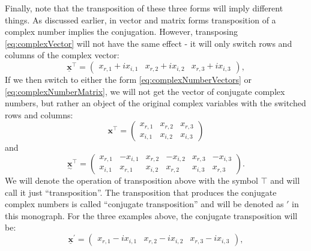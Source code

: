 \documentclass[
]{book}
\begin{document}
Finally, note that the transposition of these three forms will imply different things. As discussed earlier, in vector and matrix forms transposition of a complex number implies the conjugation. However, transposing \eqref{eq:complexVector} will not have the same effect - it will only switch rows and columns of the complex vector:
\begin{equation}
    \underline{\mathbf{x}}^{\top} = \begin{pmatrix} x_{r,1} + i x_{i,1} & x_{r,2} + i x_{i,2} & x_{r,3} + i x_{i,3}
                        \end{pmatrix} ,
    \label{eq:complexVectorTransposed}
\end{equation}
If we then switch to either the form \eqref{eq:complexNumberVectors} or \eqref{eq:complexNumberMatrix}, we will not get the vector of conjugate complex numbers, but rather an object of the original complex variables with the switched rows and columns:
\begin{equation}
    {\mathbf{x}}^{\top} = \begin{pmatrix} x_{r,1} & x_{r,2} & x_{r,3} \\
                                 x_{i,1} & x_{i,2} & x_{i,3}
                        \end{pmatrix} 
    \label{eq:complexVectorMatrixTransposed}
\end{equation}
and
\begin{equation}
    \underset{\sim}{\mathbf{x}}^{\top} = \begin{pmatrix} x_{r,1} & - x_{i,1} & x_{r,2} & - x_{i,2} & x_{r,3} & - x_{i,3} \\
                                        x_{i,1} & x_{r,1} & x_{i,2} & x_{r,2} & x_{i,3} & x_{r,3}
                        \end{pmatrix} .
    \label{eq:complexMatrixTransposed}
\end{equation}
We will denote the operation of transposition above with the symbol \(\top\) and will call it just ``transposition''. The transposition that produces the conjugate complex numbers is called ``conjugate transposition'' and will be denoted as \(\prime\) in this monograph. For the three examples above, the conjugate transposition will be:
\begin{equation}
    \underline{\mathbf{x}}^{\prime} = \begin{pmatrix} x_{r,1} - i x_{i,1} & x_{r,2} - i x_{i,2} & x_{r,3} - i x_{i,3}
                        \end{pmatrix} ,
    \label{eq:complexVectorTransposedConj}
\end{equation}
\end{document}
